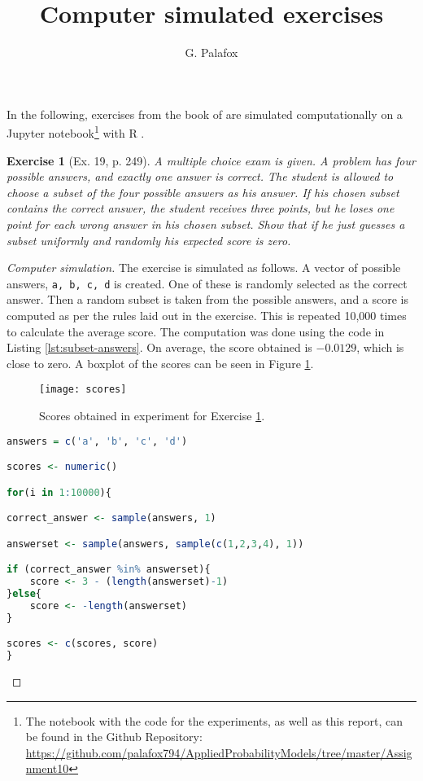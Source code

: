 \documentclass[letterpaper, 10 pt, conference]{article}
\title{Computer simulated exercises
}
\author{G. Palafox}
\newtheorem{ex}{Exercise}
\begin{document}
\maketitle
In the following, exercises from the book of \citet{snell} are simulated computationally on a Jupyter \citep{jupyter} notebook\footnote{The notebook with the code for the experiments, as well as this report, can be found in the Github Repository: \url{https://github.com/palafox794/AppliedProbabilityModels/tree/master/Assignment10}} with R \citep{R}.

\begin{ex}[Ex. 19, p. 249]\label{ex:subset-answers}
	A multiple choice exam is given. A problem has four possible answers, and exactly one answer is correct. The student is allowed to choose a subset of the four possible answers as his answer. If his chosen subset contains the correct answer, the student receives three points, but he loses one point for each wrong answer in his chosen subset. Show that if he just guesses a subset uniformly and randomly his expected score is zero. 
\end{ex}
\begin{proof}[Computer simulation]
The exercise is simulated as follows. A vector of possible answers, \texttt{a, b, c, d} is created. One of these is randomly selected as the correct answer. Then a random subset is taken from the possible answers, and a score is computed as per the rules laid out in the exercise. This is repeated 10,000 times to calculate the average score. The computation was done using the code in Listing \ref{lst:subset-answers}. On average, the score obtained is $-0.0129$, which is close to zero. A boxplot of the scores can be seen in Figure \ref{fig:subset-answers}.

 \begin{figure}
	\centering
	\texttt{[image: scores]}
	\caption{Scores obtained in experiment for Exercise \ref{ex:subset-answers}.}
	\label{fig:subset-answers}
\end{figure}

\begin{lstlisting}[language=R, caption={Code for Exercise \ref{ex:subset-answers}.}, label={lst:subset-answers} ]
answers = c('a', 'b', 'c', 'd')

scores <- numeric()

for(i in 1:10000){

correct_answer <- sample(answers, 1)

answerset <- sample(answers, sample(c(1,2,3,4), 1))

if (correct_answer %in% answerset){
	score <- 3 - (length(answerset)-1)
}else{
	score <- -length(answerset)
}

scores <- c(scores, score)
}
\end{lstlisting}
\end{proof}
\end{document}
